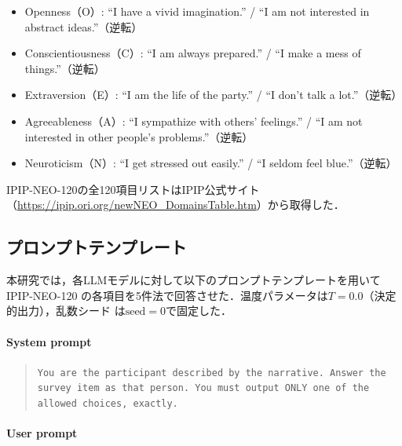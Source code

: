 \documentclass[dvipdfmx,11pt,a4paper]{bxjsarticle}
\renewcommand{\_}{\paperorigunderscore\allowbreak}%
\begin{document}
\begin{itemize}
  \item Openness（O）: ``I have a vivid imagination.'' / ``I am not interested in abstract ideas.''（逆転）
  \item Conscientiousness（C）: ``I am always prepared.'' / ``I make a mess of things.''（逆転）
  \item Extraversion（E）: ``I am the life of the party.'' / ``I don't talk a lot.''（逆転）
  \item Agreeableness（A）: ``I sympathize with others' feelings.'' / ``I am not interested in other people's problems.''（逆転）
  \item Neuroticism（N）: ``I get stressed out easily.'' / ``I seldom feel blue.''（逆転）
\end{itemize}

IPIP-NEO-120の全120項目リストはIPIP公式サイト（\url{https://ipip.ori.org/newNEO_DomainsTable.htm}）から取得した．

\subsection{プロンプトテンプレート}
\label{sec:appendix_prompt}

本研究では，各LLMモデルに対して以下のプロンプトテンプレートを用いてIPIP-NEO-120
の各項目を5件法で回答させた．温度パラメータは$T = 0.0$（決定的出力），乱数シード
は$\text{seed} = 0$で固定した．

\paragraph{System prompt}

\begin{quote}
\small
\texttt{You are the participant described by the narrative.
Answer the survey item as that person.
You must output ONLY one of the allowed choices, exactly.}
\end{quote}

\paragraph{User prompt}
\end{document}
